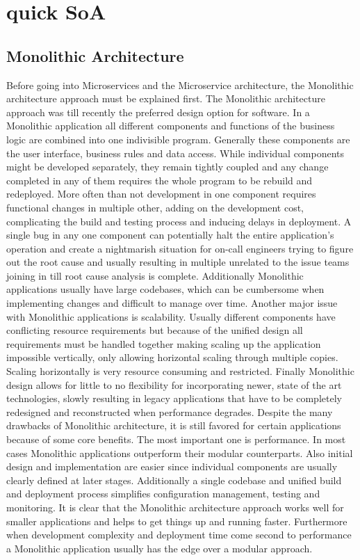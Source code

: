 \chapter{quick SoA} \label{ch:quickSoA}

\section{Monolithic Architecture}

Before going into Microservices and the Microservice architecture, the Monolithic architecture approach must be explained first. The Monolithic architecture approach was till recently the preferred design option for software. In a Monolithic application all different components and functions of the business logic are combined into one indivisible program\cite{monovsmicro}. Generally these components are the user interface, business rules and data access. While individual components might be developed separately, they remain tightly coupled\cite{whatismono} and any change completed in any of them requires the whole program to be rebuild and redeployed\cite{app10175797}. More often than not development in one component requires functional changes in multiple other, adding on the development cost, complicating the build and testing process and inducing delays in deployment. A single bug in any one component can potentially halt the entire application's operation and create a nightmarish situation for on-call engineers trying to figure out the root cause and usually resulting in multiple unrelated to the issue teams joining in till root cause analysis is complete. Additionally Monolithic applications usually have large codebases, which can be cumbersome when implementing changes and difficult to manage over time\cite{whatismono}. Another major issue with Monolithic applications is scalability. Usually different components have conflicting resource requirements but because of the unified design all requirements must be handled together making scaling up the application impossible vertically, only allowing horizontal scaling through multiple copies. Scaling horizontally is very resource consuming and restricted. Finally Monolithic design allows for little to no flexibility for incorporating newer, state of the art technologies, slowly resulting in legacy applications that have to be completely redesigned and reconstructed when performance degrades. Despite the many drawbacks of Monolithic architecture, it is still favored for certain applications because of some core benefits. The most important one is performance. In most cases Monolithic applications outperform their modular counterparts\cite{whatismono}. Also initial design and implementation are easier since individual components are usually clearly defined at later stages. Additionally a single codebase and unified build and deployment process simplifies configuration management, testing and monitoring\cite{whatismono}. It is clear that the Monolithic architecture approach works well for smaller applications and helps to get things up and running faster. Furthermore when development complexity and deployment time come second to performance a Monolithic application usually has the edge over a modular approach.

